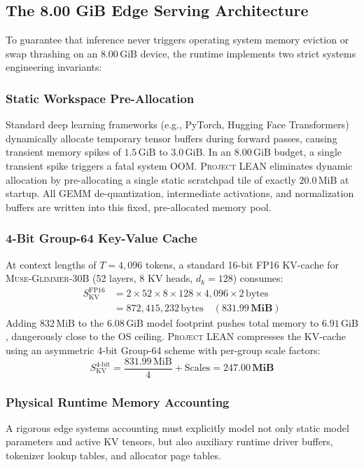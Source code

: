 \documentclass[10pt,twocolumn,letterpaper]{article}
\newcommand{\modelname}{\textsc{Muse-Glimmer-30B}}
\newcommand{\systemname}{\textsc{Project LEAN}}
\begin{document}
\subsection{The 8.00 GiB Edge Serving Architecture}
\label{sec:system_runtime}
To guarantee that inference never triggers operating system memory eviction or swap thrashing on an $8.00\,\text{GiB}$ device, the runtime implements two strict systems engineering invariants:

\subsubsection{Static Workspace Pre-Allocation}
Standard deep learning frameworks (e.g., PyTorch, Hugging Face Transformers) dynamically allocate temporary tensor buffers during forward passes, causing transient memory spikes of $1.5\,\text{GiB}$ to $3.0\,\text{GiB}$. In an $8.00\,\text{GiB}$ budget, a single transient spike triggers a fatal system OOM. \systemname{} eliminates dynamic allocation by pre-allocating a single static scratchpad tile of exactly \textbf{$20.0\,\text{MiB}$} at startup. All GEMM de-quantization, intermediate activations, and normalization buffers are written into this fixed, pre-allocated memory pool.

\subsubsection{4-Bit Group-64 Key-Value Cache}
At context lengths of $T = 4,096$ tokens, a standard 16-bit FP16 KV-cache for \modelname{} (52 layers, 8 KV heads, $d_k = 128$) consumes:
\begin{align}
    S_{\text{KV}}^{\text{FP16}} &= 2 \times 52 \times 8 \times 128 \times 4,096 \times 2\,\text{bytes} \nonumber\\
    &= 872,415,232\,\text{bytes} \quad (\mathbf{831.99\,\text{MiB}})
\end{align}
Adding $832\,\text{MiB}$ to the $6.08\,\text{GiB}$ model footprint pushes total memory to $6.91\,\text{GiB}$, dangerously close to the OS ceiling. \systemname{} compresses the KV-cache using an asymmetric 4-bit Group-64 scheme with per-group scale factors:
\begin{equation}
    S_{\text{KV}}^{\text{4-bit}} = \frac{831.99\,\text{MiB}}{4} + \text{Scales} = \mathbf{247.00\,\text{MiB}}
\end{equation}
\subsubsection{Physical Runtime Memory Accounting}
A rigorous edge systems accounting must explicitly model not only static model parameters and active KV tensors, but also auxiliary runtime driver buffers, tokenizer lookup tables, and allocator page tables. 
\end{document}
